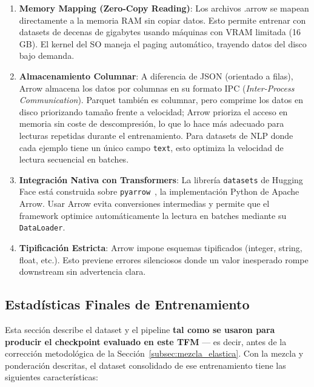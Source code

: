 \begin{enumerate}
    \item \textbf{Memory Mapping (Zero-Copy Reading)}: Los archivos .arrow se mapean directamente a la memoria RAM sin copiar datos. Esto permite entrenar con datasets de decenas de gigabytes usando máquinas con VRAM limitada (16 GB). El kernel del SO maneja el paging automático, trayendo datos del disco bajo demanda.

    \item \textbf{Almacenamiento Columnar}: A diferencia de JSON (orientado a filas), Arrow almacena los datos por columnas en su formato IPC (\textit{Inter-Process Communication}). Parquet también es columnar, pero comprime los datos en disco priorizando tamaño frente a velocidad; Arrow prioriza el acceso en memoria sin coste de descompresión, lo que lo hace más adecuado para lecturas repetidas durante el entrenamiento. Para datasets de NLP donde cada ejemplo tiene un único campo \texttt{text}, esto optimiza la velocidad de lectura secuencial en batches.

    \item \textbf{Integración Nativa con Transformers}: La librería \texttt{datasets} de Hugging Face está construida sobre \texttt{pyarrow}~\cite{apachearrow}, la implementación Python de Apache Arrow. Usar Arrow evita conversiones intermedias y permite que el framework optimice automáticamente la lectura en batches mediante su \texttt{DataLoader}.

    \item \textbf{Tipificación Estricta}: Arrow impone esquemas tipificados (integer, string, float, etc.). Esto previene errores silenciosos donde un valor inesperado rompe downstream sin advertencia clara.
\end{enumerate}

\subsection{Estadísticas Finales de Entrenamiento}

Esta sección describe el dataset y el pipeline \textbf{tal como se usaron para producir el checkpoint evaluado en este TFM} --- es decir, antes de la corrección metodológica de la Sección~\ref{subsec:mezcla_elastica}. Con la mezcla y ponderación descritas, el dataset consolidado de ese entrenamiento tiene las siguientes características:

